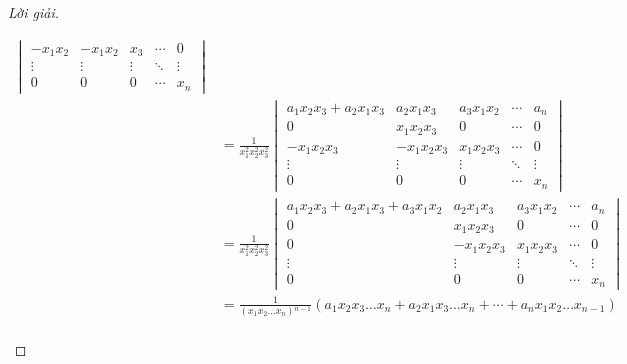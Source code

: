 \documentclass[class=nhvh-linear-algebra,crop=false]{standalone}
\begin{document}
\begin{proof}[Lời giải]
\begin{enumerate}[label = (\alph*)]
\begin{align*}
\begin{vmatrix}
				      -x_{1}x_{2}             & -x_{1}x_{2} & x_{3}  & \cdots & 0      \\
				      \vdots                  & \vdots      & \vdots & \ddots & \vdots \\
				      0                       & 0           & 0      & \cdots & x_{n}
			      \end{vmatrix}                                                                                    \\
			       & = \frac{1}{x^{2}_{1}x^{2}_{2}x^{2}_{3}}
			      \begin{vmatrix}
				      a_{1}x_{2}x_{3} + a_{2}x_{1}x_{3} & a_{2}x_{1}x_{3}  & a_{3}x_{1}x_{2} & \cdots & a_{n}  \\
				      0                                 & x_{1}x_{2}x_{3}  & 0               & \cdots & 0      \\
				      -x_{1}x_{2}x_{3}                  & -x_{1}x_{2}x_{3} & x_{1}x_{2}x_{3} & \cdots & 0      \\
				      \vdots                            & \vdots           & \vdots          & \ddots & \vdots \\
				      0                                 & 0                & 0               & \cdots & x_{n}
			      \end{vmatrix}                                                            \\
			       & = \frac{1}{x^{2}_{1}x^{2}_{2}x^{2}_{3}}
			      \begin{vmatrix}
				      a_{1}x_{2}x_{3} + a_{2}x_{1}x_{3} + a_{3}x_{1}x_{2} & a_{2}x_{1}x_{3}  & a_{3}x_{1}x_{2} & \cdots & a_{n}  \\
				      0                                                   & x_{1}x_{2}x_{3}  & 0               & \cdots & 0      \\
				      0                                                   & -x_{1}x_{2}x_{3} & x_{1}x_{2}x_{3} & \cdots & 0      \\
				      \vdots                                              & \vdots           & \vdots          & \ddots & \vdots \\
				      0                                                   & 0                & 0               & \cdots & x_{n}
			      \end{vmatrix}                                          \\
			       & = \frac{1}{(x_{1}x_{2}\ldots x_{n}){}^{n-1}}(a_{1}x_{2}x_{3}\ldots x_{n} + a_{2}x_{1}x_{3}\ldots x_{n} + \cdots + a_{n}x_{1}x_{2}\ldots x_{n-1}) \\

\end{align*}
\end{enumerate}
\end{proof}
\end{document}
